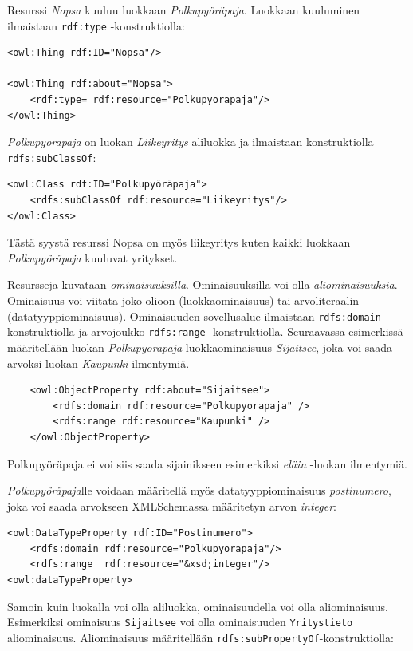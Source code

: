 \documentclass[finnish]{tktltiki2}
\theoremstyle{definition}
\theoremstyle{remark}
\begin{document}
Resurssi \textit{Nopsa} kuuluu luokkaan \textit{Polkupyöräpaja}. Luokkaan kuuluminen ilmaistaan \texttt{rdf:type} -konstruktiolla:

\begin{verbatim}
<owl:Thing rdf:ID="Nopsa"/>

<owl:Thing rdf:about="Nopsa">
    <rdf:type= rdf:resource="Polkupyorapaja"/>
</owl:Thing>
\end{verbatim} 

\textit{Polkupyorapaja} on luokan \textit{Liikeyritys} aliluokka ja ilmaistaan konstruktiolla \texttt{rdfs:subClassOf}: 

\begin{verbatim}
<owl:Class rdf:ID="Polkupyöräpaja">
    <rdfs:subClassOf rdf:resource="Liikeyritys"/>
</owl:Class>
\end{verbatim}

Tästä syystä resurssi Nopsa on myös liikeyritys kuten kaikki luokkaan \textit{Polkupyöräpaja} kuuluvat yritykset. 

Resursseja kuvataan \textit{ominaisuuksilla}. Ominaisuuksilla voi olla \textit{aliominaisuuksia}. Ominaisuus voi viitata joko olioon (luokkaominaisuus) tai arvoliteraalin (datatyyppiominaisuus)\cite{owlguide}. Ominaisuuden sovellusalue ilmaistaan \texttt{rdfs:domain} -konstruktiolla ja arvojoukko \texttt{rdfs:range} -konstruktiolla. Seuraavassa esimerkissä 
määritellään luokan \textit{Polkupyorapaja} luokkaominaisuus \textit{Sijaitsee}, joka voi saada arvoksi luokan \textit{Kaupunki} ilmentymiä.

\begin{verbatim}
    <owl:ObjectProperty rdf:about="Sijaitsee">
        <rdfs:domain rdf:resource="Polkupyorapaja" />
        <rdfs:range rdf:resource="Kaupunki" />
    </owl:ObjectProperty>
\end{verbatim}

Polkupyöräpaja ei voi siis saada sijainikseen esimerkiksi \textit{eläin} -luokan ilmentymiä.

\textit{Polkupyöräpaja}lle voidaan määritellä myös datatyyppiominaisuus \textit{postinumero}, joka voi saada arvokseen XMLSchemassa määritetyn arvon \textit{integer}:

\begin{verbatim}
<owl:DataTypeProperty rdf:ID="Postinumero">
    <rdfs:domain rdf:resource="Polkupyorapaja"/>
    <rdfs:range  rdf:resource="&xsd;integer"/>   
<owl:dataTypeProperty>
\end{verbatim}

Samoin kuin luokalla voi olla aliluokka, ominaisuudella voi olla aliominaisuus\cite{owlguide}. Esimerkiksi ominaisuus \texttt{Sijaitsee} voi olla ominaisuuden \texttt{Yritystieto} aliominaisuus. Aliominaisuus määritellään \texttt{rdfs:subPropertyOf}-konstruktiolla:
\end{document}
